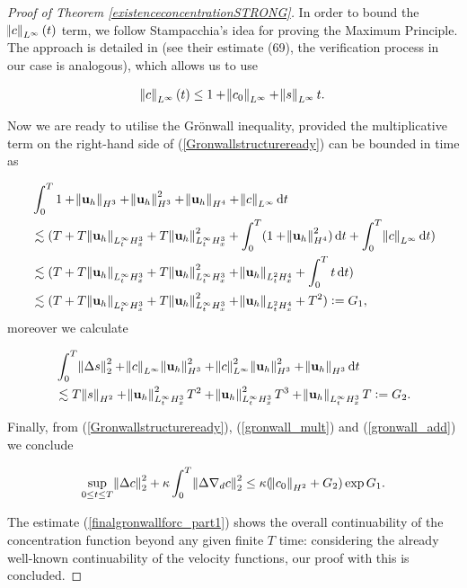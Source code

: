 \documentclass[12pt]{report}
\numberwithin{theorem}{chapter}
\numberwithin{corollary}{chapter}
\numberwithin{lemma}{chapter}
\numberwithin{remark}{chapter}
\numberwithin{definition}{chapter}
\numberwithin{prop}{chapter}
\newcommand*\diff{\mathop{}\!\mathrm{d}}
\begin{document}
\begin{proof}[Proof of Theorem \ref{existenceconcentrationSTRONG}]
In order to bound the $\norm{c}_{L^\infty} (t)$ term, we follow Stampacchia's idea for proving the Maximum Principle. The approach is detailed in \cite{cao2012global} (see their estimate (69), the verification process in our case is analogous), which allows us to use

$$\norm{c}_{L^\infty} (t) \leq 1 + \norm{c_0}_{L^\infty} + \norm{s}_{L^\infty} t.$$

Now we are ready to utilise the Gr\"onwall inequality, provided the multiplicative term on the right-hand side of (\ref{Gronwallstructureready}) can be bounded in time as

\begin{equation} \label{gronwall_mult}
  \begin{split}
    & \int_0^T 1 + \norm{\mathbf{u}_h}_{H^3} + \norm{\mathbf{u}_h}_{H^3}^2 + \norm{\mathbf{u}_h}_{H^4} + \norm{c}_{L^\infty} \diff t \\
    & \lesssim (T + T\norm{\mathbf{u}_h}_{L^\infty_t H^3_x} + T \norm{\mathbf{u}_h}_{L^\infty_t H^3_x}^2 + \int_0^T (1 + \norm{\mathbf{u}_h}_{H^4}^2) \diff t  +  \int_0^T \norm{c}_{L^\infty} \diff t )\\
    & \lesssim (T + T\norm{\mathbf{u}_h}_{L^\infty_t H^3_x} + T \norm{\mathbf{u}_h}_{L^\infty_t H^3_x}^2 + \norm{\mathbf{u}_h}_{L^2_t H^4_x}  +  \int_0^T t \diff t )\\
    & \lesssim (T + T\norm{\mathbf{u}_h}_{L^\infty_t H^3_x} + T \norm{\mathbf{u}_h}_{L^\infty_t H^3_x}^2 + \norm{\mathbf{u}_h}_{L^2_t H^4_x}  +  T^2) : = G_1,
  \end{split}
\end{equation}
%
moreover we calculate

\begin{equation} \label{gronwall_add}
  \begin{split}
    & \int_0^T \norm{\Delta s}_2^2 + \norm{c}_{L^\infty} \norm{\mathbf{u}_h}_{H^3}^2 + \norm{c}_{L^\infty}^2 \norm{\mathbf{u}_h}_{H^3}^2 + \norm{\mathbf{u}_h}_{H^3} \diff t\\
    & \lesssim T \norm{s}_{H^2} + \norm{\mathbf{u}_h}_{L^\infty_t H^3_x}^2 T^2 + \norm{\mathbf{u}_h}_{L^\infty_t H^3_x}^2 T^3 + \norm{\mathbf{u}_h}_{L^\infty_t H^3_x} T := G_2.
  \end{split}
\end{equation}

Finally, from (\ref{Gronwallstructureready}), (\ref{gronwall_mult}) and (\ref{gronwall_add}) we conclude

\begin{equation} \label{finalgronwallforc_part1}
\sup_{0 \leq t \leq T}\norm{\Delta c}_2^2 + \kappa \int_0^T \norm{\Delta \nabla_d c}_2^2 \leq \kappa (\norm{c_0}_{H^2} + G_2) \exp{G_1}.
\end{equation}

The estimate (\ref{finalgronwallforc_part1}) shows the overall continuability of the concentration function beyond any given finite $T$ time: considering the already well-known continuability of the velocity functions, our proof with this is concluded.

\end{proof}

\nocite{*}


\end{document}
